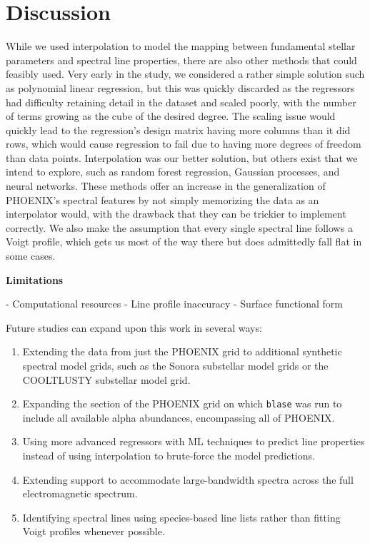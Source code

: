\documentclass[twocolumn]{aastex631}
\begin{document}
\section{Discussion}

While we used interpolation to model the mapping between fundamental stellar parameters
and spectral line properties, there are also other methods that could feasibly used. Very early in the study, we considered a rather simple
solution such as polynomial linear regression, but this was quickly discarded as the regressors
had difficulty retaining detail in the dataset and scaled poorly, with the number
of terms growing as the cube of the desired degree. The scaling issue would quickly lead to the regression's design matrix
having more columns than it did rows, which would cause regression to fail due to having more degrees
of freedom than data points. Interpolation was our better solution, but others exist that we 
intend to explore, such as random forest regression, Gaussian processes, and neural networks. These methods offer an increase in the generalization of
PHOENIX's spectral features by not simply memorizing the data as an interpolator would,
with the drawback that they can be trickier to implement correctly. We also make
the assumption that every single spectral line follows a Voigt profile, which gets us 
most of the way there but does admittedly fall flat in some cases. 


\begin{mdframed}
    \textbf{Limitations}

    - Computational resources
    - Line profile inaccuracy
    - Surface functional form

    \textcolor{lightgray}{\blindtext}
\end{mdframed}

Future studies can expand upon this work in several ways:
\begin{enumerate}[label=-]
    \item Extending the data from just the PHOENIX grid to additional synthetic spectral
          model grids, such as the Sonora substellar model grids or the COOLTLUSTY substellar model grid.
    \item Expanding the section of the PHOENIX grid on which \texttt{blase} was run to include all available alpha abundances, encompassing all of PHOENIX.
    \item Using more advanced regressors with ML techniques to predict line properties instead of using interpolation to brute-force the model predictions.
    \item Extending support to accommodate large-bandwidth spectra across the full electromagnetic spectrum.
    \item Identifying spectral lines using species-based line lists rather than fitting Voigt profiles whenever possible.
\end{enumerate}
\end{document}
